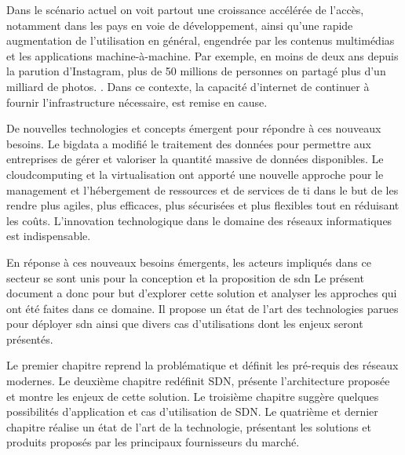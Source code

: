 \par
Dans le scénario actuel on voit 
partout une croissance accélérée de l'accès, notamment dans les pays en voie de développement, ainsi qu'une rapide augmentation de l'utilisation en général, engendrée par les contenus multimédias et les applications machine-à-machine. Par exemple, en moins de deux ans depuis la parution d'Instagram, plus de 50 millions de personnes on partagé plus d'un milliard de photos. \cite{deuxAnsInstagram}.
Dans ce contexte, la capacité d'internet de continuer à fournir l'infrastructure nécessaire, est remise en cause. \cite{InternetSustainGrowthIntro}
\par
De nouvelles technologies et concepts émergent pour répondre à ces nouveaux besoins.
Le \gls{bigdata} a modifié le traitement des données pour permettre aux entreprises de gérer et valoriser la quantité massive de données disponibles. \cite{IMBigData} Le \gls{cloudcomputing} et la \gls{virtualisation} ont apporté une nouvelle approche pour le management et l'hébergement de ressources et de services de \gls{ti}  dans le but de les rendre plus agiles, plus efficaces, plus sécurisées et plus flexibles tout en réduisant les coûts. \cite{CloudComputingIntelVision} 
L'innovation technologique dans le domaine des réseaux informatiques est indispensable. \cite{InternetEvolutionRoleSoftwareEngineeringConclusion}
\par
En réponse à ces nouveaux besoins émergents, les acteurs impliqués dans ce secteur se sont unis pour la conception et la proposition de \gls{sdn}
Le présent document a donc pour but d'explorer cette solution et analyser les approches qui ont été faites dans ce domaine. Il propose un état de l'art des technologies parues pour déployer \gls{sdn} ainsi que divers cas d'utilisations dont les enjeux seront présentés.
\par
Le premier chapitre reprend la problématique et définit les pré-requis des réseaux modernes. Le deuxième chapitre redéfinit SDN, présente l'architecture proposée et montre les enjeux de cette solution. Le troisième chapitre suggère quelques possibilités d'application et cas d'utilisation de SDN. Le quatrième et dernier chapitre réalise un état de l'art de la technologie, présentant les solutions et produits proposés par les principaux fournisseurs du marché.


